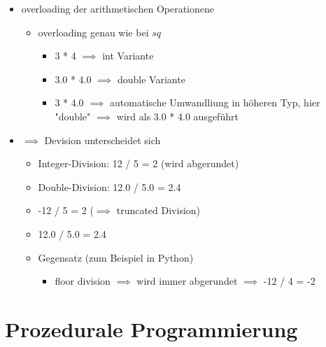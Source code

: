 \documentclass[a4paper]{scrartcl}
\theoremstyle{definition}
\theoremstyle{plain}
\theoremstyle{remark}
\theoremstyle{remark}
\begin{document}
\begin{itemize}
\begin{itemize}
\begin{itemize}
\begin{itemize}
\begin{verbatim}
#include <iostream>
#include <string>
int main() {
	std::cout << "Hello, world!" << std::endl;
	std::string out = "mein erstes Programm\n";
	std::cout << out;
	return 0;
}
\end{verbatim}
\end{itemize}
\end{itemize}
\item overloading der arithmetischen Operationene
\begin{itemize}
\item overloading genau wie bei $sq$
\begin{itemize}
\item 3 * 4 $\implies$ int Variante
\item 3.0 * 4.0 $\implies$ double Variante
\item 3 * 4.0 $\implies$ automatische Umwandliung in höheren Typ, hier "double" $\implies$ wird als 3.0 * 4.0 ausgeführt
\end{itemize}
\end{itemize}
\item $\implies$ Devision unterscheidet sich
\begin{itemize}
\item Integer-Division: 12 / 5 = 2 (wird abgerundet)
\item Double-Division: 12.0 / 5.0 = 2.4
\item -12 / 5 = 2 ($\implies$ truncated Division)
\item 12.0 / 5.0 = 2.4
\item Gegensatz (zum Beispiel in Python)
\begin{itemize}
\item floor division $\implies$ wird immer abgerundet $\implies$ -12 / 4 = -2
\end{itemize}
\end{itemize}
\end{itemize}
\end{itemize}
\section{Prozedurale Programmierung}
\label{sec-7}
\end{document}
